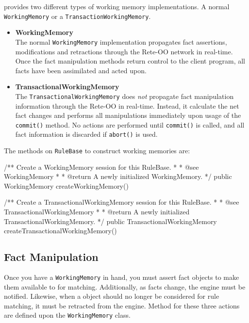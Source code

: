 \drools{} provides two different types of working memory
implementations.  A normal \verb|WorkingMemory| or a
\verb|TransactionWorkingMemory|.

\begin{itemize}

	\item \textbf{\textsf{WorkingMemory}} \\
		The normal \verb|WorkingMemory| implementation 
		propagates fact assertions, modifications and
		retractions through the Rete-OO network in
		real-time.  Once the fact manipulation 
		methods return control to the client program,
		all facts have been assimilated and acted upon.

	\item \textbf{\textsf{TransactionalWorkingMemory}} \\
		The \verb|TransactionalWorkingMemory| does \emph{not}
		propagate fact manipulation information through the
		Rete-OO in real-time.  Instead, it calculate the net
		fact changes and performs all manipulations immediately
		upon usage of the \verb|commit()| method.  No actions
		are performed until \verb|commit()| is called, and
		all fact information is discarded if \verb|abort()|
		is used.

\end{itemize}

The methods on \verb|RuleBase| to construct working memories are:

\bigskip

\begin{codelisting}    
/** Create a WorkingMemory session for this RuleBase.
 *
 *  @see WorkingMemory
 *
 *  @return A newly initialized WorkingMemory.
 */
public WorkingMemory createWorkingMemory() 

/** Create a TransactionalWorkingMemory session for this RuleBase.
 *
 *  @see TransactionalWorkingMemory
 *
 *  @return A newly initialized TransactionalWorkingMemory.
 */
public TransactionalWorkingMemory createTransactionalWorkingMemory()
\end{codelisting}

\subsection{Fact Manipulation}

Once you have a \verb|WorkingMemory| in hand, you must assert fact
objects to make them available to \drools{} for matching.  Additionally, as facts
change, the engine must be notified.  Likewise, when a object should
no longer be considered for rule matching, it must be retracted from
the engine.  Method for these three actions are defined upon the
\verb|WorkingMemory| class.

